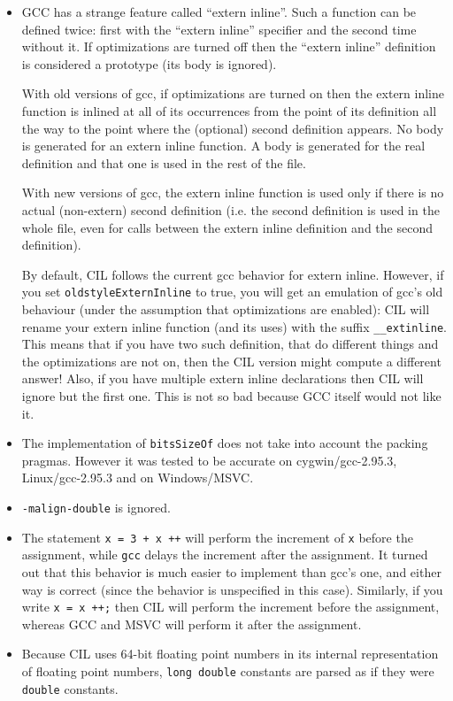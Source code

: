 \documentclass{article}
\def\t#1{{\tt #1}}
\begin{document}
\begin{itemize}
\item GCC has a strange feature called ``extern inline''. Such a function can
be defined twice: first with the ``extern inline'' specifier and the second
time without it. If optimizations are turned off then the ``extern inline''
definition is considered a prototype (its body is ignored). 

With old versions of gcc, if optimizations
are turned on then the extern inline function is inlined at all of its
occurrences from the point of its definition all the way to the point where the
(optional) second definition appears. No body is generated for an extern
inline function. A body is generated for the real definition and that one is
used in the rest of the file. 

With new versions of gcc, the extern inline function is used only if there is no
actual (non-extern) second definition (i.e. the second definition is used in the
whole file, even for calls between the extern inline definition and the second
definition).

By default, CIL follows the current gcc behavior for extern
inline. However, if you set \t{oldstyleExternInline} to true, you will
get an emulation of gcc's old behaviour (under the assumption that
optimizations are enabled): CIL will rename your extern inline
function (and its uses) with the suffix \t{\_\_extinline}. This means
that if you have two such definition, that do different things and the
optimizations are not on, then the CIL version might compute a
different answer! Also, if you have multiple extern inline
declarations then CIL will ignore but the first one. This is not so
bad because GCC itself would not like it.

\item The implementation of \t{bitsSizeOf} does not take into account the
  packing pragmas. However it was tested to be accurate on cygwin/gcc-2.95.3,
  Linux/gcc-2.95.3 and on Windows/MSVC.

\item \t{-malign-double} is ignored.

\item The statement \t{x = 3 + x ++} will perform the increment of \t{x}
  before the assignment, while \t{gcc} delays the increment after the
  assignment. It turned out that this behavior is much easier to implement
  than gcc's one, and either way is correct (since the behavior is unspecified
  in this case). Similarly, if you write \t{x = x ++;} then CIL will perform
  the increment before the assignment, whereas GCC and MSVC will perform it
  after the assignment. 

\item Because CIL uses 64-bit floating point numbers in its internal
  representation of floating point numbers, \t{long double} constants
  are parsed as if they were \t{double} constants.

\end{itemize}
\end{document}
